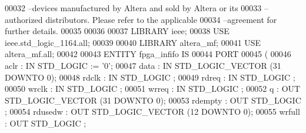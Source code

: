 \begin{DoxyCode}
{00032 \textcolor{keyword}{--devices manufactured by Altera and sold by Altera or its }
00033 \textcolor{keyword}{--authorized distributors.  Please refer to the applicable }
00034 \textcolor{keyword}{--agreement for further details.}
00035 
00036 
00037 \textcolor{vhdlkeyword}{LIBRARY }\textcolor{keywordflow}{ieee};
00038 \textcolor{vhdlkeyword}{USE }ieee.std\_logic\_1164.\textcolor{keywordflow}{all};
00039 
00040 \textcolor{vhdlkeyword}{LIBRARY }\textcolor{keywordflow}{altera\_mf};
00041 \textcolor{vhdlkeyword}{USE }\textcolor{keywordflow}{altera\_mf.all};
00042 
00043 \textcolor{keywordflow}{ENTITY }fpga_infifo \textcolor{keywordflow}{IS}
00044     \textcolor{keywordflow}{PORT}
00045     \textcolor{vhdlchar}{(}
00046         \textcolor{vhdlchar}{aclr}        \textcolor{vhdlchar}{:} \textcolor{keywordflow}{IN} \textcolor{comment}{STD\_LOGIC}  \textcolor{vhdlchar}{:=} \textcolor{vhdlchar}{'}\textcolor{vhdllogic}{}\textcolor{vhdllogic}{0}\textcolor{vhdlchar}{'};
00047         \textcolor{vhdlchar}{data}        \textcolor{vhdlchar}{:} \textcolor{keywordflow}{IN} \textcolor{comment}{STD\_LOGIC\_VECTOR} \textcolor{vhdlchar}{(}\textcolor{vhdllogic}{}\textcolor{vhdllogic}{31} \textcolor{keywordflow}{DOWNTO} \textcolor{vhdllogic}{}\textcolor{vhdllogic}{0}\textcolor{vhdlchar}{)};
00048         \textcolor{vhdlchar}{rdclk}       \textcolor{vhdlchar}{:} \textcolor{keywordflow}{IN} \textcolor{comment}{STD\_LOGIC} ;
00049         \textcolor{vhdlchar}{rdreq}       \textcolor{vhdlchar}{:} \textcolor{keywordflow}{IN} \textcolor{comment}{STD\_LOGIC} ;
00050         \textcolor{vhdlchar}{wrclk}       \textcolor{vhdlchar}{:} \textcolor{keywordflow}{IN} \textcolor{comment}{STD\_LOGIC} ;
00051         \textcolor{vhdlchar}{wrreq}       \textcolor{vhdlchar}{:} \textcolor{keywordflow}{IN} \textcolor{comment}{STD\_LOGIC} ;
00052         \textcolor{vhdlchar}{q}       \textcolor{vhdlchar}{:} \textcolor{keywordflow}{OUT} \textcolor{comment}{STD\_LOGIC\_VECTOR} \textcolor{vhdlchar}{(}\textcolor{vhdllogic}{}\textcolor{vhdllogic}{31} \textcolor{keywordflow}{DOWNTO} \textcolor{vhdllogic}{}\textcolor{vhdllogic}{0}\textcolor{vhdlchar}{)};
00053         \textcolor{vhdlchar}{rdempty}     \textcolor{vhdlchar}{:} \textcolor{keywordflow}{OUT} \textcolor{comment}{STD\_LOGIC} ;
00054         \textcolor{vhdlchar}{rdusedw}     \textcolor{vhdlchar}{:} \textcolor{keywordflow}{OUT} \textcolor{comment}{STD\_LOGIC\_VECTOR} \textcolor{vhdlchar}{(}\textcolor{vhdllogic}{}\textcolor{vhdllogic}{12} \textcolor{keywordflow}{DOWNTO} \textcolor{vhdllogic}{}\textcolor{vhdllogic}{0}\textcolor{vhdlchar}{)};
00055         \textcolor{vhdlchar}{wrfull}      \textcolor{vhdlchar}{:} \textcolor{keywordflow}{OUT} \textcolor{comment}{STD\_LOGIC} ;
}
\end{DoxyCode}
